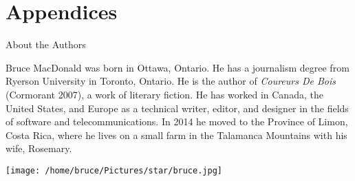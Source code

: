 \documentclass[letterpaper,10pt,twoside,titlepage,onecolumn,openany]{book}
\begin{document}












\part{Appendices}






\newpage
\thispagestyle{empty}

\begin{center}

\Large{About the Authors}

\end{center}

\vspace{20mm}
\noindent
Bruce MacDonald was born in Ottawa, Ontario. He has a journalism degree from Ryerson University in Toronto, Ontario. He is the author of \textit{Coureurs De Bois} (Cormorant 2007), a work of literary fiction. He has worked in Canada, the United States, and Europe as a technical writer, editor, and designer in the fields of software and telecommunications. In 2014 he moved to the Province of Limon, Costa Rica, where he lives on a small farm in the Talamanca Mountains with his wife, Rosemary.

\begin{center}


\texttt{[image: /home/bruce/Pictures/star/bruce.jpg]}

\end{center}
\end{document}

